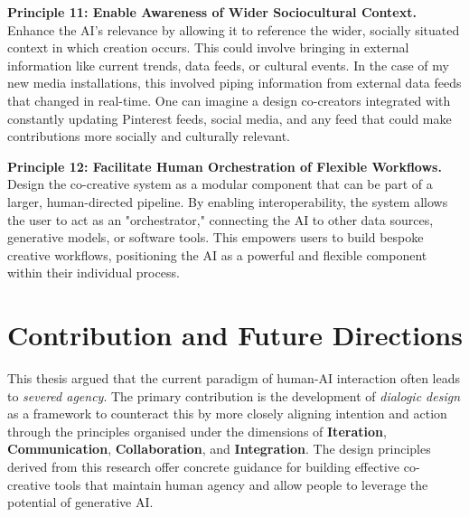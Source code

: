 \textbf{Principle 11: Enable Awareness of Wider Sociocultural Context.} Enhance the AI's relevance by allowing it to reference the wider, socially situated context in which creation occurs. This could involve bringing in external information like current trends, data feeds, or cultural events. In the case of my new media installations, this involved piping information from external data feeds that changed in real-time. One can imagine a design co-creators integrated with constantly updating Pinterest feeds, social media, and any feed that could make contributions more socially and culturally relevant. 

\textbf{Principle 12: Facilitate Human Orchestration of Flexible Workflows.} Design the co-creative system as a modular component that can be part of a larger, human-directed pipeline. By enabling interoperability, the system allows the user to act as an "orchestrator," connecting the AI to other data sources, generative models, or software tools. This empowers users to build bespoke creative workflows, positioning the AI as a powerful and flexible component within their individual process.

\section{Contribution and Future Directions}
This thesis argued that the current paradigm of human-AI interaction often leads to \textit{severed agency}. The primary contribution is the development of \textit{dialogic design} as a framework to counteract this by more closely aligning intention and action through the principles organised under the dimensions of \textbf{Iteration}, \textbf{Communication}, \textbf{Collaboration}, and \textbf{Integration}. The design principles derived from this research offer concrete guidance for building effective co-creative tools that maintain human agency and allow people to leverage the potential of generative AI.

